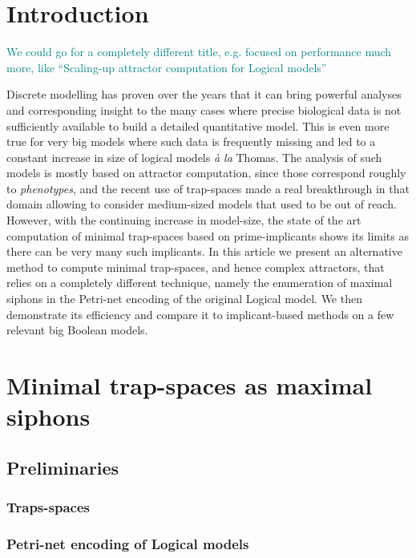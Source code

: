 \documentclass[runningheads]{llncs}
\newcommand{\sylvain}[1]{\textcolor{teal}{#1}}
\begin{document}
\section{Introduction}

\sylvain{We could go for a completely different title, e.g. focused on performance much more, like ``Scaling-up attractor computation for Logical models''}

Discrete modelling has proven over the years that it can bring powerful analyses and corresponding insight to the many cases where precise biological data is not sufficiently available to build a detailed quantitative model.
This is even more true for very big models where such data is frequently missing and led to a constant increase in size of logical models \emph{à la} Thomas.
The analysis of such models is mostly based on attractor computation, since those correspond roughly to \emph{phenotypes}, and the recent use of trap-spaces made a real breakthrough in that domain allowing to consider medium-sized models that used to be out of reach.
However, with the continuing increase in model-size, the state of the art computation of minimal trap-spaces based on prime-implicants shows its limits as there can be very many such implicants.
In this article we present an alternative method to compute minimal trap-spaces, and hence complex attractors, that relies on a completely different technique, namely the enumeration of maximal siphons in the Petri-net encoding of the original Logical model.
We then demonstrate its efficiency and compare it to implicant-based methods on a few relevant big Boolean models.

\section{Minimal trap-spaces as maximal siphons}
\subsection{Preliminaries}
\subsubsection{Traps-spaces}

\cite{klarner2015computing,klarner2017pyboolnet,cifuentes2020control}

\subsubsection{Petri-net encoding of Logical models}
\end{document}
